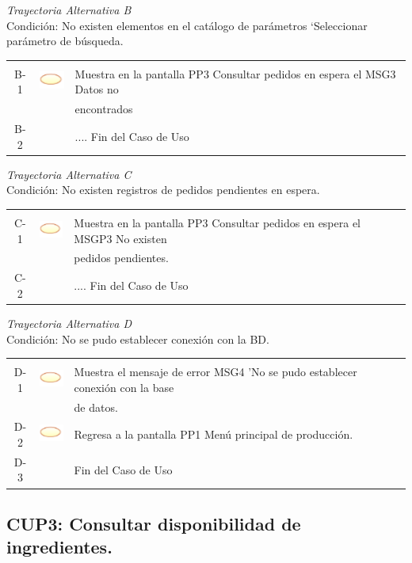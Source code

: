 \documentclass[10pt,spanish]{article}
\providecommand{\tabularnewline}{\\}
\begin{document}
	\textit{Trayectoria Alternativa B}\\
	Condición: No existen elementos en el catálogo de parámetros ‘Seleccionar parámetro de búsqueda.\\
	\begin{tabular}{ccl}
	& & \tabularnewline
	B-1 & \includegraphics{sistema} & Muestra en la pantalla PP3 Consultar pedidos en espera el MSG3 Datos no\tabularnewline
	& &  encontrados\tabularnewline
	B-2 & & .... Fin del Caso de Uso\tabularnewline
	\end{tabular}
\newpage
	\textit{Trayectoria Alternativa C}\\
	Condición: No existen registros de pedidos pendientes en espera.\\
	\begin{tabular}{ccl}
	& & \tabularnewline
	C-1 & \includegraphics{sistema} & Muestra en la pantalla PP3 Consultar pedidos en espera el MSGP3 No existen\tabularnewline
	& & pedidos pendientes.\tabularnewline
	C-2 & & .... Fin del Caso de Uso\tabularnewline
	\end{tabular}
	
	\textit{Trayectoria Alternativa D}\\
	Condición: No se pudo establecer conexión con la BD.\\
	\begin{tabular}{ccl}
	& & \tabularnewline
	D-1 & \includegraphics{sistema} & Muestra el mensaje de error MSG4 'No se pudo establecer conexión con la base\tabularnewline
	& & de datos.\tabularnewline
	D-2 & \includegraphics{sistema} & Regresa a la pantalla PP1 Menú principal de producción.\tabularnewline
	D-3 & & Fin del Caso de Uso\tabularnewline	
	\end{tabular}


\newpage
		\subsection{CUP3: Consultar disponibilidad de ingredientes.}
\end{document}
